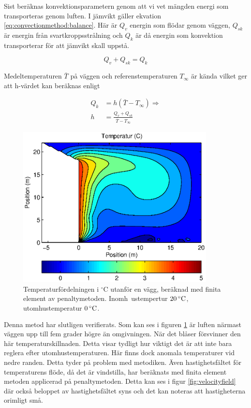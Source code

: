 Sist beräknas konvektionsparametern genom att vi vet mängden energi som transporteras
genom luften. I jämvikt gäller ekvation \eqref{eq:convectionmethod:balance}.
Här är $Q_v$ energin som flödar genom väggen, $Q_{sk}$ är energin från
svartkroppsstrålning och $Q_k$ är då energin som konvektion transporterar
för att jämvikt skall uppstå.

\begin{equation}
\label{eq:convectionmethod:balance}
Q_v + Q_{sk} = Q_k
\end{equation}

Medeltemperaturen $\bar{T}$ på väggen och referenstemperaturen $T_\infty$ är kända
vilket ger att h-värdet kan beräknas enligt

\begin{align}
Q_k &= h(\bar{T}-T_\infty) \Rightarrow \nonumber \\
h &= \frac{Q_v + Q_{sk}}{\bar{T}-T_\infty}
\end{align}


\begin{figure}[hpbt]
\centering
\includegraphics[width=10cm]{images/convectemperature.eps}
\caption{\label{fig:temp_dist}Temperaturfördelningen i $^\circ\mbox{C}$ utanför en vägg, beräknad med finita element av penaltymetoden. Inomh\
ustempertur $\unit[20]{^\circ C}$, utomhustemperatur $\unit[0]{^\circ C}$.}
\end{figure}

Denna metod har slutligen verifierats. Som kan ses i figuren \ref{fig:temp_dist} är luften närmast väggen upp till fem grader
högre än omgivningen. När det blåser försvinner den här temperaturskillnaden. Detta
visar tydligt hur viktigt det är att inte bara reglera efter utomhustemperaturen.
Här finns dock anomala temperaturer vid nedre randen. Detta tyder på problem med
metodiken.
Även hastighetsfältet för temperaturens flöde, då det är vindstilla, har beräknats med finita element metoden
applicerad på penaltymetoden. Detta kan ses i figur \ref{fig:velocityfield} där också
beloppet av hastighetsfältet syns och det kan noteras att hastigheterna orimligt små.

